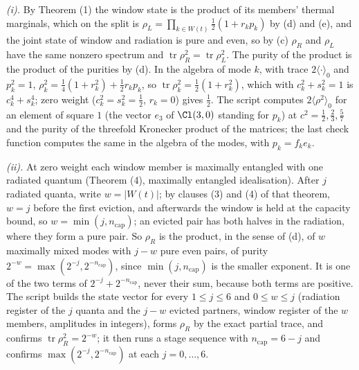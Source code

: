 \emph{(i).} By Theorem (1) the window state is the product of its members' thermal marginals, which on the split is $\rho_{L} = \prod_{k \in W(t)}\tfrac12(1 + r_{k}p_{k})$ by (d) and (e), and the joint state of window and radiation is pure and even, so by (c) $\rho_{R}$ and $\rho_{L}$ have the same nonzero spectrum and $\operatorname{tr}\rho_{R}^{2} = \operatorname{tr}\rho_{L}^{2}$. The purity of the product is the product of the purities by (d). In the algebra of mode $k$, with trace $2\langle\cdot\rangle_{0}$ and $p_{k}^{2} = 1$, $\rho_{k}^{2} = \tfrac14(1 + r_{k}^{2}) + \tfrac12 r_{k}p_{k}$, so $\operatorname{tr}\rho_{k}^{2} = \tfrac12(1 + r_{k}^{2})$, which with $c_{k}^{2} + s_{k}^{2} = 1$ is $c_{k}^{4} + s_{k}^{4}$; zero weight ($c_{k}^{2} = s_{k}^{2} = \tfrac12$, $r_{k} = 0$) gives $\tfrac12$. The script computes $2\langle\rho^{2}\rangle_{0}$ for an element of square $1$ (the vector $e_{3}$ of $\Cl(3,0)$ standing for $p_{k}$) at $c^{2} = \tfrac12, \tfrac23, \tfrac57$ and the purity of the threefold Kronecker product of the matrices; the last check function computes the same in the algebra of the modes, with $p_{k} = f_{k}e_{k}$.

\emph{(ii).} At zero weight each window member is maximally entangled with one radiated quantum (Theorem (4), maximally entangled idealisation). After $j$ radiated quanta, write $w = |W(t)|$; by clauses (3) and (4) of that theorem, $w = j$ before the first eviction, and afterwards the window is held at the capacity bound, so $w = \min(j, n_{\mathrm{cap}})$; an evicted pair has both halves in the radiation, where they form a pure pair. So $\rho_{R}$ is the product, in the sense of (d), of $w$ maximally mixed modes with $j - w$ pure even pairs, of purity $2^{-w} = \max(2^{-j}, 2^{-n_{\mathrm{cap}}})$, since $\min(j, n_{\mathrm{cap}})$ is the smaller exponent. It is one of the two terms of $2^{-j} + 2^{-n_{\mathrm{cap}}}$, never their sum, because both terms are positive. The script builds the state vector for every $1 \leq j \leq 6$ and $0 \leq w \leq j$ (radiation register of the $j$ quanta and the $j - w$ evicted partners, window register of the $w$ members, amplitudes in integers), forms $\rho_{R}$ by the exact partial trace, and confirms $\operatorname{tr}\rho_{R}^{2} = 2^{-w}$; it then runs a stage sequence with $n_{\mathrm{cap}} = 6 - j$ and confirms $\max(2^{-j}, 2^{-n_{\mathrm{cap}}})$ at each $j = 0, \ldots, 6$.

